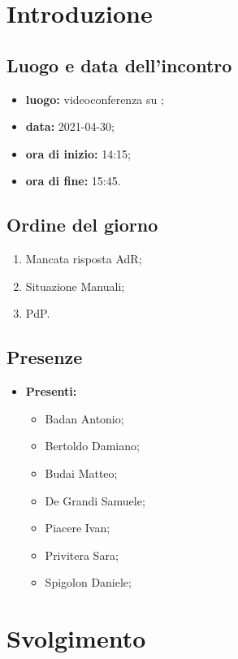 \section*{Introduzione}
\subsection*{Luogo e data dell'incontro}
\begin{itemize}
	\item \textbf{luogo:} videoconferenza su ;
	\item \textbf{data:} 2021-04-30;
	\item \textbf{ora di inizio:} 14:15;
	\item \textbf{ora di fine:} 15:45.
\end{itemize}

\subsection*{Ordine del giorno}
\begin{enumerate}
	\item Mancata risposta AdR;
	\item Situazione Manuali;
	\item PdP.
		
\end{enumerate}

\subsection*{Presenze}
\begin{itemize}
	\item \textbf{Presenti: }
	\begin{itemize}
		\item Badan Antonio;
		\item Bertoldo Damiano;
		\item Budai Matteo;
		\item De Grandi Samuele;
		\item Piacere Ivan;
		\item Privitera Sara;
		\item Spigolon Daniele;
	\end{itemize}
\end{itemize}


\section*{Svolgimento}

